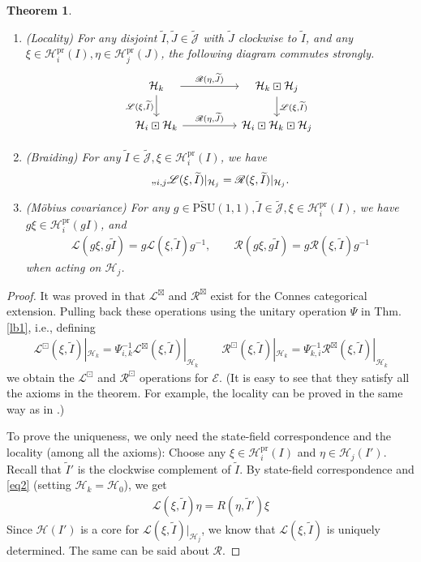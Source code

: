 \documentclass[11pt,b5paper,notitlepage]{article}
\theoremstyle{definition}
\theoremstyle{plain}
\newtheorem{thm}[df]{Theorem}
\newcommand{\mc}{\mathcal}
\newcommand{\wtd}{\widetilde}
\newcommand{\scr}{\mathscr}
\newcommand{\Jtd}{\widetilde{\mathcal J}}
\newcommand{\pr}{\mathrm {pr}}
\newcommand{\UPSU}{\widetilde{\mathrm{PSU}}(1,1)}
\numberwithin{equation}{section}
\begin{document}
\begin{thm}
\begin{enumerate}[label=(\alph*)]
\item (Locality) For any  disjoint $\wtd I,\wtd J\in\Jtd$ with $\wtd J$ clockwise to $\wtd I$, and any $\xi\in\mc H_i^\pr(I),\eta\in\mc H_j^\pr(J)$, the following diagram  commutes strongly.
\begin{equation}\label{eq2}
\begin{tikzcd}[column sep=huge]
\quad \mc H_k\quad \arrow[r,"{\scr R(\eta,\wtd J)}"] \arrow[d, "{\scr L(\xi,\wtd I)}"'] &\quad \mc H_k\boxdot\mc H_j\quad \arrow[d, "{\scr L(\xi,\wtd I)}"]\\
\mc H_i\boxdot\mc H_k\arrow[r,"{\scr R(\eta,\wtd J)}"] &\mc H_i\boxdot\mc H_k\boxdot\mc H_j
\end{tikzcd}
\end{equation}
	
\item (Braiding) For any $\wtd I\in\Jtd,\xi\in\mc H_i^\pr(I)$, we have
	\begin{align}
	\ss_{i,j} \scr L(\xi,\wtd I)|_{\mc H_j}=\scr R(\xi,\wtd I)|_{\mc H_j}.
	\end{align}
	
\item (M\"obius covariance) For any $g\in\UPSU,\wtd I\in\wtd{\mc J},\xi\in\mc H_i^\pr(I)$, we have $g\xi\in\mc H_i^\pr(g I)$, and
	\begin{align}
	\scr L(g\xi,g\wtd I)=g\scr L(\xi,\wtd I)g^{-1},\qquad \scr R(g\xi,g\wtd I)=g\scr R(\xi,\wtd I)g^{-1}
	\end{align}
	when acting on $\mc H_j$.
\end{enumerate}
\end{thm}


\begin{proof}
It was proved in \cite[Sec. 2]{Gui20} that $\scr L^\boxtimes$ and $\scr R^\boxtimes$ exist for the Connes categorical extension. Pulling back these operations using the unitary operation $\Psi$ in Thm. \ref{lb1}, i.e., defining 
\begin{align}\label{eq10}
\scr L^\boxdot(\xi,\wtd I)|_{\mc H_k}=\Psi_{i,k}^{-1}\scr L^\boxtimes(\xi,\wtd I)|_{\mc H_k}\qquad  \scr R^\boxdot(\xi,\wtd I)|_{\mc H_k}=\Psi_{k,i}^{-1}\scr R^\boxtimes(\xi,\wtd I)|_{\mc H_k}
\end{align}
we obtain the $\scr L^\boxdot$ and $\scr R^\boxdot$ operations for $\scr E$. (It is easy to see that they satisfy all the axioms in the theorem. For example, the locality can be proved in the same way as in \cite[Cor. 1.5.2]{Gui20}.)

To prove the uniqueness, we only need the state-field correspondence and the locality (among all the axioms): Choose any $\xi\in\mc H_i^\pr(I)$ and $\eta\in\mc H_j(I')$. Recall that $\wtd I'$ is the clockwise complement of $\wtd I$. By state-field correspondence and \eqref{eq2} (setting $\mc H_k=\mc H_0$), we get
\begin{align}\label{eq4}
\scr L(\xi,\wtd I)\eta=R(\eta,\wtd I')\xi
\end{align}
Since $\mc H(I')$ is a core for $\scr L(\xi,\wtd I)|_{\mc H_j}$, we know that $\scr L(\xi,\wtd I)$ is uniquely determined. The same can be said about $\scr R$.
\end{proof}
\end{document}
